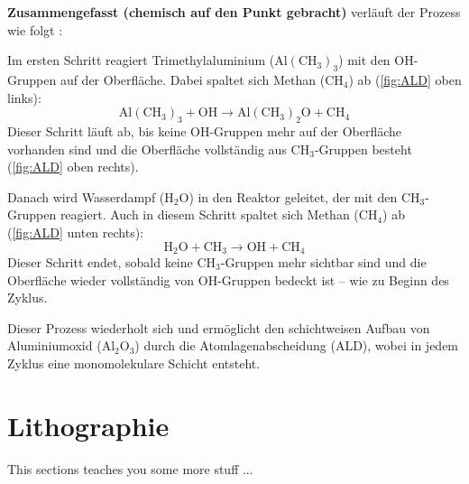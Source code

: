 \documentclass{article} %
\begin{document}
\textbf{Zusammengefasst (chemisch auf den Punkt gebracht)} verläuft der Prozess wie folgt \cite{keplinger2024CVD}:

Im ersten Schritt reagiert Trimethylaluminium (\(\mathrm{Al(CH_3)_3}\)) mit den OH-Gruppen auf der Oberfläche. Dabei spaltet sich Methan ($\mathrm{CH_4}$) ab (\autoref{fig:ALD} oben links):
$$
\mathrm{Al(CH_3)_3} + \mathrm{OH} \rightarrow \mathrm{Al(CH_3)_2O} + \mathrm{CH_4}
$$
Dieser Schritt läuft ab, bis keine OH-Gruppen mehr auf der Oberfläche vorhanden sind und die Oberfläche vollständig aus \(\mathrm{CH_3}\)-Gruppen besteht (\autoref{fig:ALD} oben rechts).

Danach wird Wasserdampf (\(\mathrm{H_2O}\)) in den Reaktor geleitet, der mit den \(\mathrm{CH_3}\)-Gruppen reagiert. Auch in diesem Schritt spaltet sich Methan ($\mathrm{CH_4}$) ab (\autoref{fig:ALD} unten rechts):
$$
\mathrm{H_2O} + \mathrm{CH_3} \rightarrow \mathrm{OH} + \mathrm{CH_4}
$$
Dieser Schritt endet, sobald keine \(\mathrm{CH_3}\)-Gruppen mehr sichtbar sind und die Oberfläche wieder vollständig von \(\mathrm{OH}\)-Gruppen bedeckt ist -- wie zu Beginn des Zyklus.

Dieser Prozess wiederholt sich und ermöglicht den schichtweisen Aufbau von Aluminiumoxid (\(\mathrm{Al_2O_3}\)) durch die Atomlagenabscheidung (ALD), wobei in jedem Zyklus eine monomolekulare Schicht entsteht.

\vspace{1em}
\section{Lithographie} %
This sections teaches you some more stuff ...

\thispagestyle{empty}
\newpage
\end{document}
